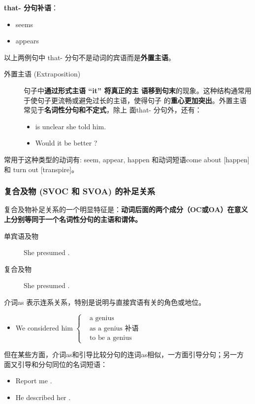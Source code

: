 \textbf{that- 分句补语}：
\begin{itemize}
\item {} seems 
\item {} appears 
\end{itemize}
以上两例句中 that- 分句不是动词的宾语而是\textbf{外置主语}。
\begin{description}
\item[外置主语 (Extraposition)] 句子中\textbf{通过形式主语 “it” 将真正的主
    语移到句末}的现象。这种结构通常用于使句子更流畅或避免过长的主语，使得句子
  的\textbf{重心更加突出}。外置主语常见于\textbf{名词性分句和不定式}，除上
  面that- 分句外，还有：
  \begin{itemize}
  \item {} is unclear  she told him.

  \item Would it be better ?
  \end{itemize}
\end{description}
常用于这种类型的动词有: seem, appear, happen 和动词短语come about
[happen]和 turn out [transpire]。

\subsubsection{复合及物 (SVOC 和 SVOA) 的补足关系}

复合及物补足关系的一个明显特征是：\textbf{动词后面的两个成分（OC或OA）在意义
  上分别等同于一个名词性分句的主语和谓体。}
\begin{description}
\item[单宾语及物] She presumed .
\item[复合及物] She presumed .
\end{description}

介词as 表示连系关系，特别是说明与直接宾语有关的角色或地位。
\begin{itemize}
\item We considered him $ \left\{
    \begin{aligned}
      &\text{a genius} \\
      &\text{as a genius 补语} \\
      &\text{to be a genius}
    \end{aligned}
  \right. $
\end{itemize}
但在某些方面，介词as和引导比较分句的连词as相似，一方面引导分句；另一方
面又引导和分句同位的名词短语：
\begin{itemize}
\item Report me .

\item He described her .
\end{itemize}


